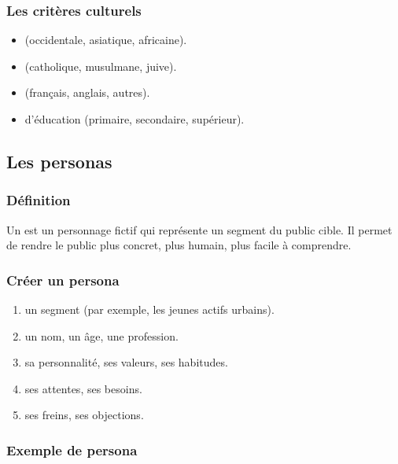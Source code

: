 \subsubsection{Les critères culturels}

\begin{itemize}
    \item {} (occidentale, asiatique, africaine).
    \item {} (catholique, musulmane, juive).
    \item {} (français, anglais, autres).
    \item {} d'éducation (primaire, secondaire, supérieur).
\end{itemize}

\subsection{Les personas}

\subsubsection{Définition}

Un  est un personnage fictif qui représente un segment du public cible. Il permet de rendre le public plus concret, plus humain, plus facile à comprendre.

\subsubsection{Créer un persona}

\begin{enumerate}
    \item {} un segment (par exemple, les jeunes actifs urbains).
    \item {} un nom, un âge, une profession.
    \item {} sa personnalité, ses valeurs, ses habitudes.
    \item {} ses attentes, ses besoins.
    \item {} ses freins, ses objections.
\end{enumerate}

\subsubsection{Exemple de persona}

